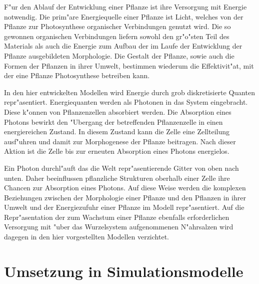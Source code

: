 F"ur den Ablauf der Entwicklung einer Pflanze ist ihre Versorgung mit
Energie notwendig. Die prim"are Energiequelle einer Pflanze ist Licht,
welches von der Pflanze zur Photosynthese organischer Verbindungen
genutzt wird. Die so gewonnen organischen Verbindungen
liefern sowohl den gr"o"sten Teil des Materials als auch die Energie zum Aufbau
der im Laufe der Entwicklung der Pflanze ausgebildeten Morphologie. Die Gestalt
der Pflanze, sowie auch die Formen der Pflanzen in ihrer Umwelt, bestimmen wiederum
die Effektivit"at, mit der eine Pflanze Photosynthese betreiben kann.

In den hier entwickelten Modellen wird Energie durch grob diskretisierte
Quanten repr"asentiert. Energiequanten werden als Photonen in das
System eingebracht. Diese k"onnen von Pflanzenzellen absorbiert werden.
Die Absorption eines Photons bewirkt den "Ubergang der betreffenden
Pflanzenzelle in einen energiereichen Zustand. In diesem Zustand kann die
Zelle eine Zellteilung ausf"uhren und damit zur Morphogenese der Pflanze
beitragen. Nach dieser Aktion ist die Zelle bis zur erneuten Absorption
eines Photons energielos.

Ein Photon durchl"auft das die Welt repr"asentierende Gitter von oben nach unten.
Daher beeinflussen pflanzliche Strukturen oberhalb einer Zelle ihre
Chancen zur Absorption eines Photons. Auf diese Weise werden die komplexen
Beziehungen zwischen der Morphologie einer Pflanze und den Pflanzen in
ihrer Umwelt und der Energiezufuhr einer Pflanze im Modell repr"asentiert.
Auf die Repr"asentation der zum Wachstum einer Pflanze ebenfalls erforderlichen
Versorgung mit "uber das Wurzelsystem aufgenommenen N"ahrsalzen wird dagegen
in den hier vorgestellten Modellen verzichtet.







\section{Umsetzung in Simulationsmodelle}
\label{modeldef}


